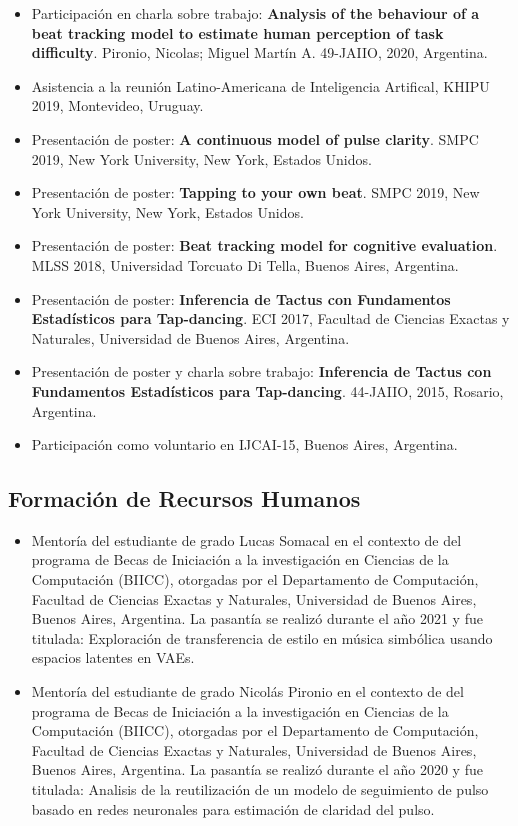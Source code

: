 \documentclass[a4paper,10pt]{article}
\begin{document}
\begin{itemize}
    \item Participación en charla sobre trabajo:
\textbf{Analysis of the behaviour of a beat tracking model to estimate human
        perception of task difficulty}. Pironio, Nicolas; Miguel Martín A. 49-JAIIO, 2020, Argentina.
    \item Asistencia a la reunión Latino-Americana de Inteligencia Artifical,
        KHIPU 2019, Montevideo, Uruguay.
    \item Presentación de poster:
        \textbf{A continuous model of pulse clarity}.
        SMPC 2019, New York University, New York, Estados Unidos.
    \item Presentación de poster:
        \textbf{Tapping to your own beat}.
        SMPC 2019, New York University, New York, Estados Unidos.
    \item Presentación de poster:
        \textbf{Beat tracking model for cognitive evaluation}.
        MLSS 2018, Universidad Torcuato Di Tella, Buenos Aires, Argentina.
    \item Presentación de poster: \textbf{Inferencia de Tactus con Fundamentos Estadísticos para
Tap-dancing}.
    ECI 2017, Facultad de Ciencias Exactas y Naturales, Universidad de Buenos
        Aires, Argentina.
    \item Presentación de poster y charla sobre trabajo:
\textbf{Inferencia de Tactus con Fundamentos Estadísticos para
        Tap-dancing}. 44-JAIIO, 2015, Rosario, Argentina.
    \item Participación como voluntario en IJCAI-15, Buenos Aires, Argentina.
\end{itemize}

\subsection{Formación de Recursos Humanos}

\begin{itemize}
\item Mentoría del estudiante de grado Lucas Somacal en el contexto de 
del programa de Becas de Iniciación a la investigación en Ciencias de la
Computación (BIICC), otorgadas por el Departamento de Computación, Facultad
de Ciencias Exactas y Naturales, Universidad de Buenos Aires, Buenos Aires,
  Argentina. La pasantía se realizó durante el año 2021
y fue titulada: Exploración
de transferencia de estilo en música simbólica usando espacios latentes en
  VAEs.

\item
Mentoría del estudiante de grado Nicolás Pironio en el contexto de 
del programa de Becas de Iniciación a la investigación en Ciencias de la
Computación (BIICC), otorgadas por el Departamento de Computación, Facultad
de Ciencias Exactas y Naturales, Universidad de Buenos Aires, Buenos Aires,
  Argentina. La pasantía se realizó durante el año 2020
y fue titulada: Analisis de la reutilización de un modelo de seguimiento de
pulso basado en redes neuronales para estimación de claridad del pulso.
\end{itemize}
\end{document}
